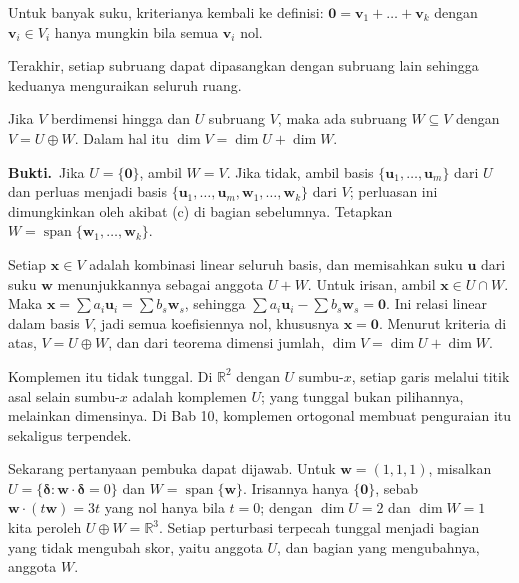 Untuk banyak suku, kriterianya kembali ke definisi: $\mathbf{0}=\mathbf{v}_{1}+\dots+
\mathbf{v}_{k}$ dengan $\mathbf{v}_{i}\in V_{i}$ hanya mungkin bila semua $\mathbf{v}_{i}$
nol.

Terakhir, setiap subruang dapat dipasangkan dengan subruang lain sehingga keduanya
menguraikan seluruh ruang.

\begin{teorema}[Komplemen]
Jika $V$ berdimensi hingga dan $U$ subruang $V$, maka ada subruang $W\subseteq V$ dengan
$V=U\oplus W$. Dalam hal itu $\dim V=\dim U+\dim W$.
\end{teorema}

\par\medskip\noindent\textbf{Bukti.}\ 
Jika $U=\{\mathbf{0}\}$, ambil $W=V$. Jika tidak, ambil basis
$\{\mathbf{u}_{1},\dots,\mathbf{u}_{m}\}$ dari $U$ dan perluas menjadi basis
$\{\mathbf{u}_{1},\dots,\mathbf{u}_{m},\mathbf{w}_{1},\dots,\mathbf{w}_{k}\}$ dari $V$;
perluasan ini dimungkinkan oleh akibat (c) di bagian sebelumnya. Tetapkan
$W=\operatorname{span}\{\mathbf{w}_{1},\dots,\mathbf{w}_{k}\}$.

Setiap $\mathbf{x}\in V$ adalah kombinasi linear seluruh basis, dan memisahkan suku
$\mathbf{u}$ dari suku $\mathbf{w}$ menunjukkannya sebagai anggota $U+W$. Untuk irisan, ambil
$\mathbf{x}\in U\cap W$. Maka
$\mathbf{x}=\sum a_{i}\mathbf{u}_{i}=\sum b_{s}\mathbf{w}_{s}$, sehingga
$\sum a_{i}\mathbf{u}_{i}-\sum b_{s}\mathbf{w}_{s}=\mathbf{0}$. Ini relasi linear dalam basis
$V$, jadi semua koefisiennya nol, khususnya $\mathbf{x}=\mathbf{0}$. Menurut kriteria di
atas, $V=U\oplus W$, dan dari teorema dimensi jumlah,
$\dim V=\dim U+\dim W$.

Komplemen itu tidak tunggal. Di $\mathbb{R}^{2}$ dengan $U$ sumbu-$x$, setiap garis melalui
titik asal selain sumbu-$x$ adalah komplemen $U$; yang tunggal bukan pilihannya, melainkan
dimensinya. Di Bab 10, komplemen ortogonal membuat penguraian itu sekaligus terpendek.

Sekarang pertanyaan pembuka dapat dijawab. Untuk $\mathbf{w}=(1,1,1)$, misalkan
$U=\{\boldsymbol{\delta}:\mathbf{w}\cdot\boldsymbol{\delta}=0\}$ dan
$W=\operatorname{span}\{\mathbf{w}\}$. Irisannya hanya $\{\mathbf{0}\}$, sebab
$\mathbf{w}\cdot(t\mathbf{w})=3t$ yang nol hanya bila $t=0$; dengan $\dim U=2$ dan
$\dim W=1$ kita peroleh $U\oplus W=\mathbb{R}^{3}$. Setiap perturbasi terpecah tunggal menjadi
bagian yang tidak mengubah skor, yaitu anggota $U$, dan bagian yang mengubahnya, anggota $W$.

